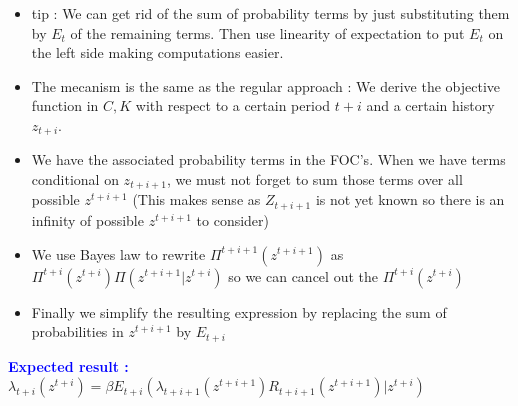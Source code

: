 \documentclass{article}
\begin{document}
\begin{itemize}
    \item tip : We can get rid of the sum of probability terms by just substituting them by $E_t$ of the remaining terms. Then use linearity of expectation to put $E_t$ on the left side making computations easier. 
    \item The mecanism is the same as the regular approach : We derive the objective function in $C, K$ with respect to a certain period $t+i$ and a certain history $z_{t+i}$.
    \item We have the associated probability terms in the FOC's. When we have terms conditional on $z_{t+i+1}$, we must not forget to sum those terms over all possible $z^{t+i+1}$ (This makes sense as $Z_{t+i+1}$ is not yet known so there is an infinity of possible $z^{t+i+1}$ to  consider)
    \item We use Bayes law to rewrite $\Pi^{t+i+1}(z^{t+i+1}) $ as $\Pi^{t+i}(z^{t+i})\Pi(z^{t+i+1}|z^{t+i})$ so we can cancel out the $\Pi^{t+i}(z^{t+i})$
    \item Finally we simplify the resulting expression by replacing the sum of probabilities in $z^{t+i+1}$ by $E_{t+i}$
\end{itemize}
\begin{expectedresultsbox}
    \textcolor{blue}{\textbf{Expected result : }} $\lambda_{t+i}(z^{t+i})=\beta E_{t+i}(\lambda_{t+i+1}(z^{t+i+1})R_{t+i+1}(z^{t+i+1})|z^{t+i})$
\end{expectedresultsbox}
\end{document}
